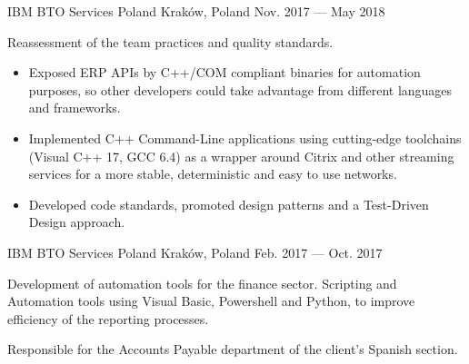 \begin{cventries}
    {IBM BTO Services Poland} %
    {Kraków, Poland} %
    {Nov. 2017 --- May 2018} %
    {
        \begin{cvitems} %
        \item {Reassessment of the team practices and quality standards.}
            \begin{itemize}
                \item {Exposed ERP APIs by C++/COM compliant binaries for automation purposes,
                    so other developers could take advantage from different languages and frameworks.}
                \item {Implemented C++ Command-Line applications using cutting-edge toolchains
                    (Visual C++ 17, GCC 6.4) as a wrapper around Citrix and other streaming services
                for a more stable, deterministic and easy to use networks.}
                \item {Developed code standards, promoted design patterns and a Test-Driven Design approach.}
            \end{itemize}
        \end{cvitems}
    }

    {IBM BTO Services Poland} %
    {Kraków, Poland} %
    {Feb. 2017 --- Oct. 2017} %
    {
        \begin{cvitems} %
        \item {Development of automation tools for the finance sector. Scripting and Automation
                tools using Visual Basic, Powershell and Python, to improve efficiency of the
            reporting processes.}
        \item {Responsible for the Accounts Payable department of the client's Spanish section.}
        \end{cvitems}
    }

\end{cventries}
